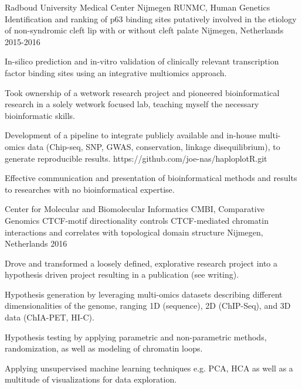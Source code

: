 

\begin{cventries}

  \cventry
    {Radboud University Medical Center Nijmegen RUNMC, Human Genetics} %
    {Identification and ranking of p63 binding sites putatively involved in the etiology of non-syndromic cleft lip with or without cleft palate} %
    {Nijmegen, Netherlands} %
    {2015-2016} %
    { 
      \begin{cvitems} %
        \item {In-silico prediction and in-vitro validation of clinically relevant transcription factor binding sites using an integrative multiomics approach.}
        \item {Took ownership of a wetwork research project and pioneered bioinformatical research in a solely wetwork focused lab, teaching myself the necessary bioinformatic skills.}
        \item {Development of a pipeline to integrate publicly available and in-house multi-omics data (Chip-seq, SNP, GWAS, conservation, linkage disequilibrium), to generate reproducible results. https://github.com/joe-nas/haploplotR.git}
        \item {Effective communication and presentation of bioinformatical methods and results to researches with no bioinformatical expertise.}
      \end{cvitems}
    }

  \cventry
    {Center for Molecular and Biomolecular Informatics CMBI, Comparative Genomics} %
    {CTCF-motif directionality controls CTCF-mediated chromatin interactions and correlates with topological domain structure} %
    {Nijmegen, Netherlands} %
    {2016} %
    {
      \begin{cvitems} %
        \item {Drove and transformed a loosely defined, explorative research project into a hypothesis driven project resulting in a publication (see writing).}
        \item {Hypothesis generation by leveraging multi-omics datasets describing different dimensionalities of the genome, ranging 1D (sequence), 2D (ChIP-Seq), and 3D data (ChIA-PET, HI-C).}
        \item {Hypothesis testing by applying parametric and non-parametric methods, randomization, as well as modeling of chromatin loops.}
        \item {Applying unsupervised machine learning techniques e.g. PCA, HCA as well as a multitude of visualizations for data exploration.}
      \end{cvitems}
    }


\end{cventries}
